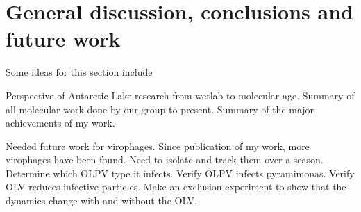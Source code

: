 \chapter{General discussion, conclusions and future work}
\label{ch:conc}
Some ideas for this section include


Perspective of Antarctic Lake research from wetlab to molecular age.
Summary of all molecular work done by our group to present.
Summary of the major achievements of my work.

Needed future work for virophages. Since publication of my work, more virophages have been found. 
Need to isolate and track them over a season.
Determine which OLPV type it infects.
Verify OLPV infects pyramimonas.
Verify OLV reduces infective particles.
Make an exclusion experiment to show that the dynamics change with and without
the OLV. 


 
